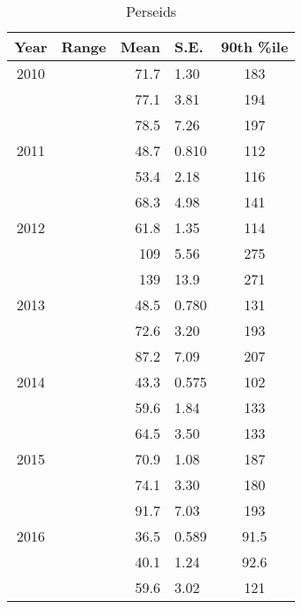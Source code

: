 \begin{table}
	\centering
	\begin{tabular}{|c|c|r@{ \,$\pm$\, }l|c|}
		\hline 
		Year & Range & Mean & S.E. & 90th \%ile\\ 
		\hline 
		2010 & & 71.7 & 1.30 & 183   \\ 
		\hline 
		& &	77.1 & 3.81 & 194   \\ 
		\hline 
		& & 78.5 & 7.26 & 197   \\ 
		\hline 
		2011 & & 48.7 & 0.810 & 112   \\ 
		\hline 
		& & 53.4 & 2.18 & 116   \\ 
		\hline 
		& & 68.3 & 4.98 & 141   \\ 
		\hline 
		2012 & & 61.8 & 1.35 & 114   \\ 
		\hline 
		& & 109 & 5.56 & 275   \\ 
		\hline 
		& & 139 & 13.9 & 271   \\ 
		\hline 
		2013 & & 48.5 & 0.780 & 131   \\ 
		\hline 
		& & 72.6 & 3.20 & 193   \\ 
		\hline 
		& & 87.2 & 7.09 & 207   \\ 
		\hline 
		2014 & & 43.3 & 0.575 & 102   \\ 
		\hline 
		& & 59.6 & 1.84 & 133   \\ 
		\hline 
		& & 64.5 & 3.50 & 133  \\ 
		\hline 
		2015 & & 70.9 & 1.08 & 187   \\ 
		\hline 
		& & 74.1 & 3.30 & 180   \\ 
		\hline 
		& & 91.7 & 7.03 & 193   \\ 
		\hline
		2016 & & 36.5 & 0.589 & 91.5	\\
		\hline 
		& & 40.1 & 1.24 & 92.6   \\ 
		\hline 
		& & 59.6 & 3.02 & 121   \\ 
		\hline 
	\end{tabular}
	\caption{Perseids} 
\end{table}

